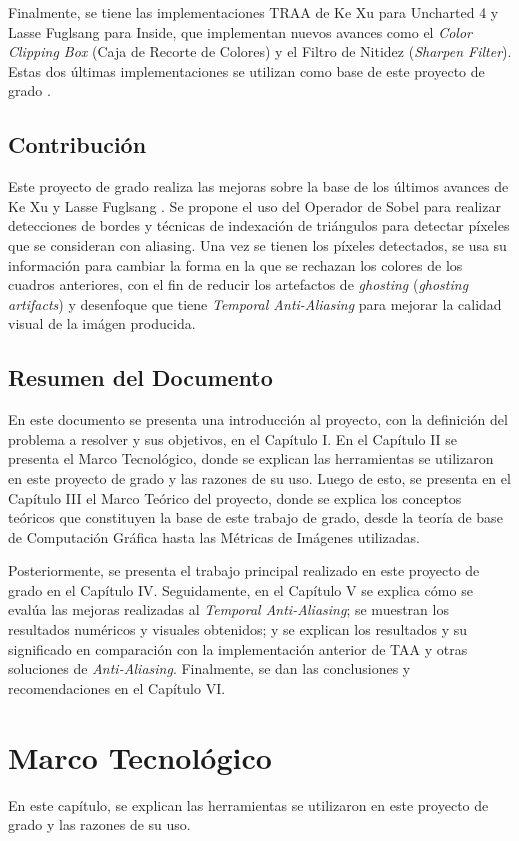 \documentclass[pregrado]{tesis-usb} %
\begin{document}
Finalmente, se tiene las implementaciones TRAA de Ke Xu para Uncharted 4 y Lasse Fuglsang para Inside, que implementan nuevos avances como el \textit{Color Clipping Box} (Caja de Recorte de Colores) y el Filtro de Nitidez (\textit{Sharpen Filter}). Estas dos últimas implementaciones se utilizan como base de este proyecto de grado \cite{Fuglsand2016, XU2016}.


\section{Contribución}
Este proyecto de grado realiza las mejoras sobre la base de los últimos avances de Ke Xu y Lasse Fuglsang \cite{Fuglsand2016, XU2016}. Se propone el uso del Operador de Sobel para realizar detecciones de bordes y técnicas de indexación de triángulos para detectar píxeles que se consideran con aliasing. Una vez se tienen los píxeles detectados, se usa su información para cambiar la forma en la que se rechazan los colores de los cuadros anteriores, con el fin de reducir los artefactos de \textit{ghosting} (\textit{ghosting artifacts})  y desenfoque que tiene \textit{Temporal Anti-Aliasing} para mejorar la calidad visual de la imágen producida.

\section{Resumen del Documento}
En este documento se presenta una introducción al proyecto, con la definición del problema a resolver y sus objetivos, en el Capítulo I. En el Capítulo II se presenta el Marco Tecnológico, donde se explican las herramientas se utilizaron en este proyecto de grado y las razones de su uso. Luego de esto, se presenta en el Capítulo III el Marco Teórico del proyecto, donde se explica los conceptos teóricos que constituyen la base de este trabajo de grado, desde la teoría de base de Computación Gráfica hasta las Métricas de Imágenes utilizadas. 

Posteriormente, se presenta el trabajo principal realizado en este proyecto de grado en el Capítulo IV. Seguidamente, en el Capítulo V se explica cómo se evalúa las mejoras realizadas al \textit{Temporal Anti-Aliasing}; se muestran los resultados numéricos y visuales obtenidos; y se explican los resultados y su significado en comparación con la implementación anterior de TAA y otras soluciones de \textit{Anti-Aliasing}. Finalmente, se dan las conclusiones y recomendaciones en el Capítulo VI.


\chapter{Marco Tecnológico}
En este capítulo, se explican las herramientas se utilizaron en este proyecto de grado y las razones de su uso.
\end{document}
